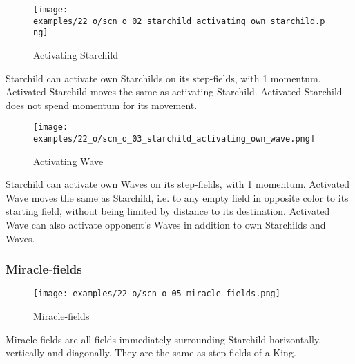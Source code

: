 \vspace*{-0.9\baselineskip}
\noindent
\begin{wrapfigure}[7]{l}{0.4\textwidth}
\centering
\texttt{[image: examples/22\_o/scn\_o\_02\_starchild\_activating\_own\_starchild.png]}
\caption{Activating Starchild}
\label{fig:scn_o_02_starchild_activating_own_starchild}
\end{wrapfigure}
Starchild can activate own Starchilds on its step-fields, with 1 momentum. Activated
Starchild moves the same as activating Starchild. Activated Starchild does not spend
momentum for its movement.

\noindent
\begin{wrapfigure}[10]{l}{0.4\textwidth}
\centering
\texttt{[image: examples/22\_o/scn\_o\_03\_starchild\_activating\_own\_wave.png]}
\caption{Activating Wave}
\label{fig:scn_o_03_starchild_activating_own_wave}
\end{wrapfigure}
Starchild can activate own Waves on its step-fields, with 1 momentum. Activated Wave
moves the same as Starchild, i.e. to any empty field in opposite color to its starting
field, without being limited by distance to its destination.\newline
\indent
Activated Wave can also activate opponent's Waves in addition to own Starchilds and
Waves.

\clearpage %

\subsubsection*{Miracle-fields}
\label{sec:One/Starchild/Movement/Miracle-fields}

\noindent
\begin{wrapfigure}[5]{l}{0.4\textwidth}
\centering
\texttt{[image: examples/22\_o/scn\_o\_05\_miracle\_fields.png]}
\caption{Miracle-fields}
\label{fig:scn_o_05_miracle_fields}
\end{wrapfigure}
Miracle-fields are all fields immediately surrounding Starchild horizontally,
vertically and diagonally. They are the same as step-fields of a King.

\vspace*{2.1\baselineskip}
